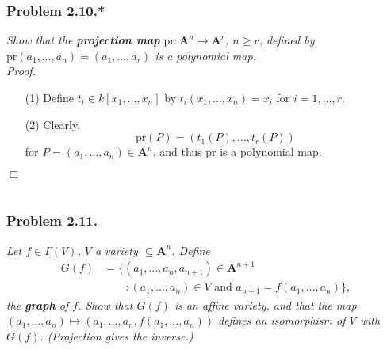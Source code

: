 \documentclass{article}
\begin{document}



\subsubsection*{Problem 2.10.*}
\emph{Show that the \textbf{projection map} $\mathrm{pr}: \mathbf{A}^n \to \mathbf{A}^r$,
$n \geq r$, defined by $\mathrm{pr}(a_1,\ldots,a_n) = (a_1,\ldots,a_r)$ is a polynomial map.} \\

\emph{Proof.}
\begin{enumerate}
\item[(1)]
  Define $t_i \in k[x_1,\ldots,x_n]$ by $t_i(x_1,\ldots,x_n) = x_i$
  for $i = 1, \ldots, r$.

\item[(2)]
  Clearly,
  \[
    \mathrm{pr}(P) = (t_1(P),\ldots,t_r(P))
  \]
  for $P = (a_1,\ldots,a_n) \in \mathbf{A}^n$,
  and thus $\mathrm{pr}$ is a polynomial map.
\end{enumerate}
$\Box$ \\\\






\subsubsection*{Problem 2.11.}
\emph{Let $f \in \Gamma(V)$, $V$ a variety $\subseteq \mathbf{A}^n$.
Define
\begin{align*}
  G(f) &= \{ (a_1,\ldots,a_n,a_{n+1}) \in \mathbf{A}^{n+1} \\
  &\qquad : (a_1,\ldots,a_n) \in V \text{ and } a_{n+1} = f (a_1,\ldots,a_n) \},
\end{align*}
the \textbf{graph} of $f$.
Show that $G(f)$ is an affine variety,
and that the map $(a_1,\ldots,a_n) \mapsto (a_1,\ldots,a_n,f(a_1,\ldots,a_n))$
defines an isomorphism of $V$ with $G(f)$. (Projection gives the inverse.)} \\
\end{document}
